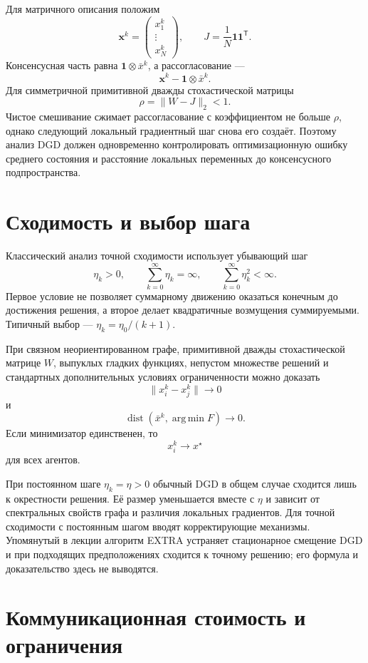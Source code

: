 Для матричного описания положим
\[
    \mathbf x^k
    =
    \begin{pmatrix}
        x_1^k\\
        \vdots\\
        x_N^k
    \end{pmatrix},
    \qquad
    J=\frac1N\mathbf1\mathbf1^{\mathsf T}.
\]
Консенсусная часть равна
\(\mathbf1\otimes\bar x^k\), а рассогласование ---
\[
    \mathbf x^k-\mathbf1\otimes\bar x^k.
\]
Для симметричной примитивной дважды стохастической матрицы
\[
    \rho
    =
    \lVert W-J\rVert_2
    <1.
\]
Чистое смешивание сжимает рассогласование с коэффициентом не больше
\(\rho\), однако следующий локальный градиентный шаг снова его создаёт.
Поэтому анализ DGD должен одновременно контролировать оптимизационную
ошибку среднего состояния и расстояние локальных переменных до
консенсусного подпространства.

\section{Сходимость и выбор шага}

Классический анализ точной сходимости использует убывающий шаг
\[
    \eta_k>0,
    \qquad
    \sum_{k=0}^{\infty}\eta_k=\infty,
    \qquad
    \sum_{k=0}^{\infty}\eta_k^2<\infty.
\]
Первое условие не позволяет суммарному движению оказаться конечным до
достижения решения, а второе делает квадратичные возмущения
суммируемыми. Типичный выбор --- \(\eta_k=\eta_0/(k+1)\).

При связном неориентированном графе, примитивной дважды
стохастической матрице \(W\), выпуклых гладких функциях, непустом
множестве решений и стандартных дополнительных условиях
ограниченности можно доказать
\[
    \lVert x_i^k-x_j^k\rVert\to0
\]
и
\[
    \operatorname{dist}
    \left(
        \bar x^k,
        \operatorname*{arg\,min}F
    \right)
    \to0.
\]
Если минимизатор единственен, то
\[
    x_i^k\to x^\star
\]
для всех агентов.

При постоянном шаге \(\eta_k=\eta>0\) обычный DGD в общем случае
сходится лишь к окрестности решения. Её размер уменьшается вместе с
\(\eta\) и зависит от спектральных свойств графа и различия локальных
градиентов. Для точной сходимости с постоянным шагом вводят
корректирующие механизмы. Упомянутый в лекции алгоритм EXTRA устраняет
стационарное смещение DGD и при подходящих предположениях сходится к
точному решению; его формула и доказательство здесь не выводятся.

\section{Коммуникационная стоимость и ограничения}

